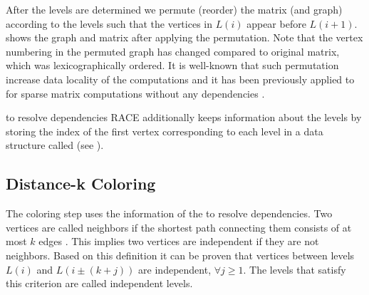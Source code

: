 After the levels are determined we permute (reorder) the matrix (and graph) according
to the levels such that the vertices in $L(i)$ appear before $L(i+1)$.  
shows the graph and matrix after applying the permutation. Note that the vertex numbering 
in the permuted graph has changed compared to original matrix, which was lexicographically ordered.
It is well-known  that such permutation increase data locality
of the computations and it has been previously applied to for sparse matrix
computations without any dependencies \cite{RCM_Sparse_computation}.

\Inorder to resolve dependencies \acrshort{RACE} additionally keeps information
about the levels by storing the index of the first vertex corresponding
to each level in a data structure called \levelPtr (see ).

\subsection{Distance-k Coloring}
The \DK coloring step uses the information of the \levelPtr to resolve
dependencies. Two vertices are called \DK neighbors if the shortest path connecting 
them consists of at most $k$ edges \cite{dist_k_def}. This implies two vertices
 are \DK independent if they are not \DK neighbors. Based on this definition
 it can be proven that vertices between levels $L(i)$ and $L(i \pm (k+j))$ are
 \DK independent, $\forall j\ge1$. The levels that satisfy this criterion
 are called \DK independent levels.
 
